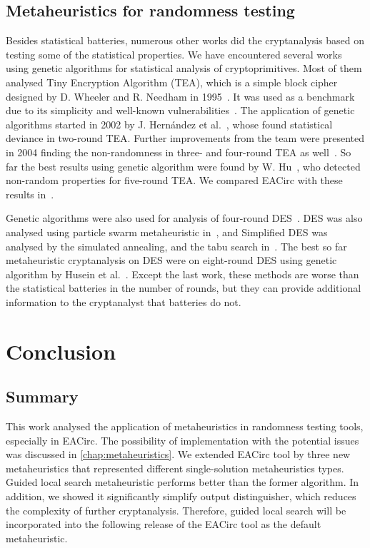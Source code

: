 \documentclass[
    digital,    %
    oneside,    %
    color,
    11pt,
    nocover,
    notable,
    nolof,
    nolot,
]{fithesis3}
\begin{document}
\section{Metaheuristics for randomness testing}
\label{sec:relatwork-paper}

Besides statistical batteries, numerous other works did the cryptanalysis based on testing some of the statistical properties. We have encountered several works using genetic algorithms for statistical analysis of cryptoprimitives. Most of them analysed Tiny Encryption Algorithm (TEA), which is a simple block cipher designed by D. Wheeler and R. Needham in 1995~\cite{TEA}. It was used as a benchmark due to its simplicity and well-known vulnerabilities~\cite{TEAAttack}. The application of genetic algorithms started in 2002 by J. Hernández et al.~\cite{twoRoundsTea}, whose found statistical deviance in two-round TEA. Further improvements from the team were presented in 2004 finding the non-randomness in three- and four-round TEA as well~\cite{fourRoundsTea}. So far the best results using genetic algorithm were found by W. Hu~\cite{fiveRoundsTea}, who detected non-random properties for five-round TEA. We compared EACirc with these results in~\cite{kubicek2016new}.

Genetic algorithms were also used for analysis of four-round DES~\cite{song2007cryptanalysis}. DES was also analysed using particle swarm metaheuristic in~\cite{shahzad2009cryptanalysis}, and Simplified DES was analysed by the simulated annealing, and the tabu search in~\cite{nalini2005cryptanalysis}. The best so far metaheuristic cryptanalysis on DES were on eight-round DES using genetic algorithm by Husein et al.~\cite{husein2007genetic}. Except the last work, these methods are worse than the statistical batteries in the number of rounds, but they can provide additional information to the cryptanalyst that batteries do not.


\chapter{Conclusion}
\label{chap:conclusion}

\section{Summary}
\label{sec:conclusion-summary}

This work analysed the application of metaheuristics in randomness testing tools, especially in EACirc. The possibility of implementation with the potential issues was discussed in \cref{chap:metaheuristics}. We extended EACirc tool by three new metaheuristics that represented different single-solution metaheuristics types. Guided local search metaheuristic performs better than the former algorithm. In addition, we showed it significantly simplify output distinguisher, which reduces the complexity of further cryptanalysis. Therefore, guided local search will be incorporated into the following release of the EACirc tool as the default metaheuristic.
\end{document}
